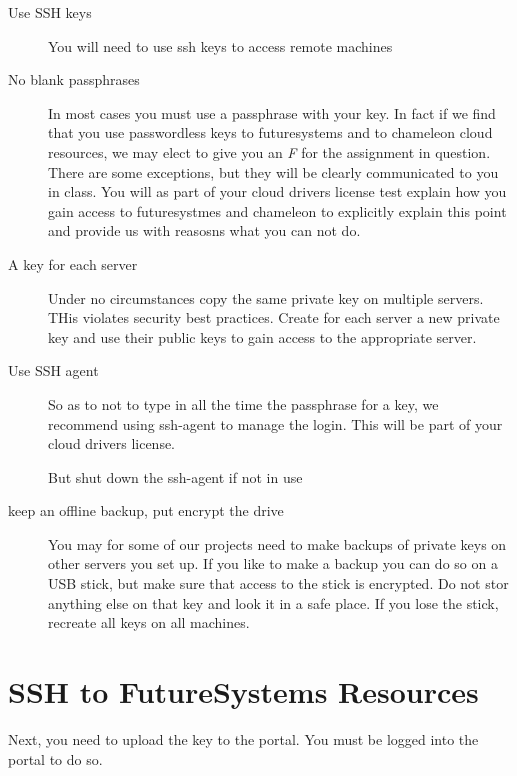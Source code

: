 \begin{description}

\item[Use SSH keys] You will need to use ssh keys to access remote machines

\item[No blank passphrases] In most cases you must use a passphrase
  with your key. In fact if we find that you use passwordless keys to
  futuresystems and to chameleon cloud resources, we may elect to give
  you an {\em F} for the assignment in question. There are some
  exceptions, but they will be clearly communicated to you in
  class. You will as part of your cloud drivers license test explain
  how you gain access to futuresystmes and chameleon to explicitly
  explain this point and provide us with reasosns what you can not do.

\item[A key for each server] Under no circumstances copy the same
  private key on multiple servers. THis violates security best
  practices. Create for each server a new private key and use their
  public keys to gain access to the appropriate server.

\item[Use SSH agent] So as to not to type in all the time the
  passphrase for a key, we recommend using ssh-agent to manage the
  login. This will be part of your cloud drivers license.

  But shut down the ssh-agent if not in use

\item[keep an offline backup, put encrypt the drive] You may for some
  of our projects need to make backups of private keys on other
  servers you set up. If you  like to make a backup you can do so on a
  USB stick, but make sure that access to the stick is encrypted. Do
  not stor anything else on that key and look it in a safe place. If
  you lose the stick, recreate all keys on all machines.

\end{description}


\section{SSH to FutureSystems Resources}

Next, you need to upload the key to the portal. You must be logged into
the portal to do so.

